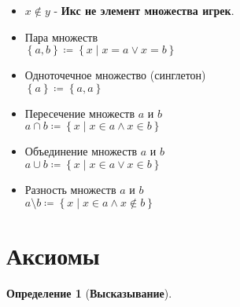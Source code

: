 \documentclass[fleqn,11pt]{article}
\theoremstyle{definition}
\newtheorem{definition}{Определение}
\begin{document}
\begin{itemize}
    \item $x \notin y$ - \textbf{Икс не элемент множества игрек}.
\end{itemize}

\begin{itemize}
    \item Пара множеств ~\\
	$\left\{a,b\right\} \coloneqq \left\{ x \mid x = a \lor x = b \right\}$
    \item Одноточечное множество (синглетон) ~\\
    	$\left\{a\right\} \coloneqq \left\{a, a \right\}$
    \item Пересечение множеств $a$ и $b$ ~\\
    	$a \cap b \coloneqq \left\{x \mid x \in a \land x \in b\right\}$
    \item Объединение множеств $a$ и $b$ ~\\
			$a \cup b \coloneqq \left\{x \mid x \in a \lor x \in b\right\}$
		\item Разность множеств $a$ и $b$ ~\\
			$a \setminus b \coloneqq \left\{x \mid x \in a \land x \notin b \right\}$
\end{itemize}

\section{Аксиомы}

\begin{definition}[\textbf{Высказывание}] ~\\
\end{definition}
\end{document}

